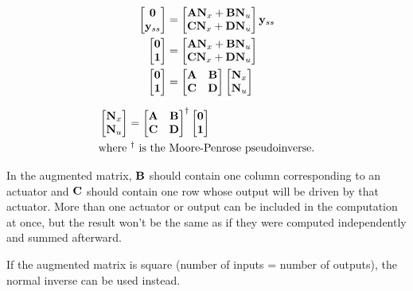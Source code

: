 \begin{align*}
  \begin{bmatrix}
    \mathbf{0} \\
    \mathbf{y}_{ss}
  \end{bmatrix} &=
  \begin{bmatrix}
    \mathbf{A}\mathbf{N}_x + \mathbf{B}\mathbf{N}_u \\
    \mathbf{C}\mathbf{N}_x + \mathbf{D}\mathbf{N}_u
  \end{bmatrix}
  \mathbf{y}_{ss} \\
  \begin{bmatrix}
    \mathbf{0} \\
    \mathbf{1}
  \end{bmatrix} &=
  \begin{bmatrix}
    \mathbf{A}\mathbf{N}_x + \mathbf{B}\mathbf{N}_u \\
    \mathbf{C}\mathbf{N}_x + \mathbf{D}\mathbf{N}_u
  \end{bmatrix} \\
  \begin{bmatrix}
    \mathbf{0} \\
    \mathbf{1}
  \end{bmatrix} &=
  \begin{bmatrix}
    \mathbf{A} & \mathbf{B} \\
    \mathbf{C} & \mathbf{D}
  \end{bmatrix}
  \begin{bmatrix}
    \mathbf{N}_x \\
    \mathbf{N}_u
  \end{bmatrix}
\end{align*}

\begin{theorem}
  \begin{align}
    &\begin{bmatrix}
      \mathbf{N}_x \\
      \mathbf{N}_u
    \end{bmatrix} =
    \begin{bmatrix}
      \mathbf{A} & \mathbf{B} \\
      \mathbf{C} & \mathbf{D}
    \end{bmatrix}^{\dagger}
    \begin{bmatrix}
      \mathbf{0} \\
      \mathbf{1}
    \end{bmatrix} \\
    &\text{where $^\dagger$ is the Moore-Penrose pseudoinverse.} \nonumber
  \end{align}

  In the augmented matrix, $\mathbf{B}$ should contain one column corresponding to
  an actuator and $\mathbf{C}$ should contain one row whose output will be driven
  by that actuator. More than one actuator or output can be included in the
  computation at once, but the result won't be the same as if they were computed
  independently and summed afterward.

  If the augmented matrix is square (number of inputs = number of outputs), the
  normal inverse can be used instead.
\end{theorem}

